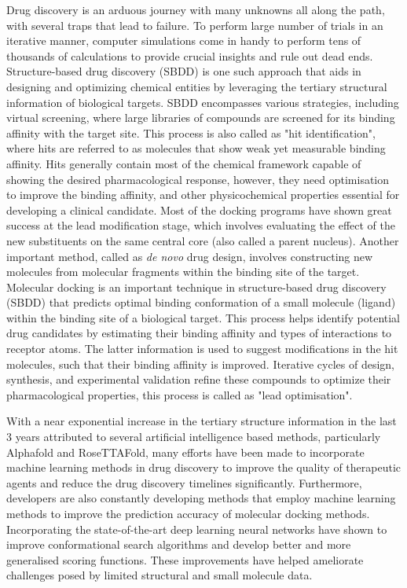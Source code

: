 \documentclass[10pt, a4paper]{book}
\begin{document}

Drug discovery\cite{bib32} is an arduous journey with many unknowns all along the path, with several traps that lead to failure. To perform large number of trials in an iterative manner, computer simulations\cite{bib33, bib34} come in handy to perform tens of thousands of calculations to provide crucial insights and rule out dead ends. Structure-based drug discovery (SBDD) is one such approach that aids in designing and optimizing chemical entities by leveraging the tertiary structural information of biological targets. SBDD encompasses various strategies, including virtual screening, where large libraries of compounds are screened for its binding affinity with the target site. This process is also called as "hit identification", where hits are referred to as molecules that show weak yet measurable binding affinity. Hits generally contain most of the chemical framework capable of showing the desired pharmacological response, however, they need optimisation to improve the binding affinity, and other physicochemical properties essential for developing a clinical candidate. Most of the docking programs have shown great success at the lead modification stage, which involves evaluating the effect of the new substituents on the same central core (also called a parent nucleus)\cite{bib53}. 
Another important method, called as \textit{de novo} drug design, involves constructing new molecules from molecular fragments within the binding site of the target.  Molecular docking\cite{bib35} is an important technique in structure-based drug discovery (SBDD) that predicts optimal binding conformation of a small molecule (ligand) within the binding site of a biological target. This process helps identify potential drug candidates by estimating their binding affinity and types of interactions to receptor atoms. The latter information is used to suggest modifications in the hit molecules, such that their binding affinity is improved. Iterative cycles of design, synthesis, and experimental validation refine these compounds to optimize their pharmacological properties, this process is called as "lead optimisation". 

With a near exponential increase in the tertiary structure information in the last 3 years attributed to several artificial intelligence based methods, particularly Alphafold\cite{bib37} and RoseTTAFold\cite{bib38}, many efforts have been made to incorporate machine learning methods in drug discovery to improve the quality of therapeutic agents and reduce the drug discovery timelines significantly\cite{bib36}. Furthermore, developers are also constantly developing methods that employ machine learning methods to improve the prediction accuracy of molecular docking methods. Incorporating the state-of-the-art deep learning neural networks have shown to improve conformational search algorithms and develop better and more generalised scoring functions. These improvements have helped ameliorate challenges posed by limited structural and small molecule data\cite{bib39, bib40}. 
\end{document}
